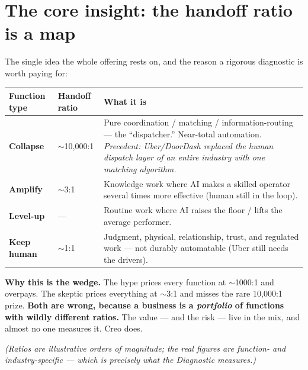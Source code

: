 \documentclass[11pt]{article}
\begin{document}
\section{The core insight: the handoff ratio is a map}
The single idea the whole offering rests on, and the reason a rigorous diagnostic is worth
paying for:

\begin{center}
\renewcommand{\arraystretch}{1.35}\small
\begin{tabular}{p{2.6cm} p{2.4cm} p{8.0cm}}
\toprule
\textbf{Function type} & \textbf{Handoff ratio} & \textbf{What it is} \\
\midrule
\textbf{Collapse} & $\sim$10{,}000:1 & Pure coordination / matching / information-routing --- the ``dispatcher.'' Near-total automation. \emph{Precedent: Uber/DoorDash replaced the human dispatch layer of an entire industry with one matching algorithm.} \\
\textbf{Amplify} & $\sim$3:1 & Knowledge work where AI makes a skilled operator several times more effective (human still in the loop). \\
\textbf{Level-up} & --- & Routine work where AI raises the floor / lifts the average performer. \\
\textbf{Keep human} & $\sim$1:1 & Judgment, physical, relationship, trust, and regulated work --- not durably automatable (Uber still needs the drivers). \\
\bottomrule
\end{tabular}
\end{center}

\begin{callout}
\textbf{Why this is the wedge.} The hype prices every function at $\sim$1000:1 and overpays. The
skeptic prices everything at $\sim$3:1 and misses the rare 10{,}000:1 prize. \textbf{Both are
wrong, because a business is a \emph{portfolio} of functions with wildly different ratios.} The
value --- and the risk --- live in the mix, and almost no one measures it. Creo does.
\end{callout}

\emph{(Ratios are illustrative orders of magnitude; the real figures are function- and
industry-specific --- which is precisely what the Diagnostic measures.)}
\end{document}
